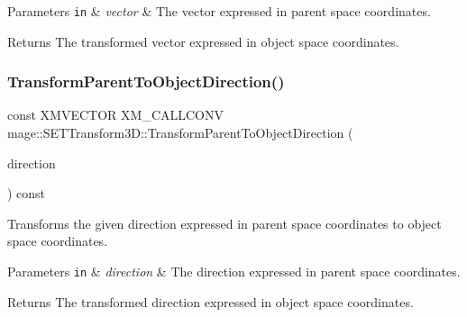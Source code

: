 \begin{DoxyParams}[1]{Parameters}
\mbox{\tt in}  & {\em vector} & The vector expressed in parent space coordinates. \\
\hline
\end{DoxyParams}
\begin{DoxyReturn}{Returns}
The transformed vector expressed in object space coordinates. 
\end{DoxyReturn}
\mbox{\label{classmage_1_1_s_e_t_transform3_d_a021c5832dd165db20d984c8e53315dc9}} 
\subsubsection{\texorpdfstring{Transform\+Parent\+To\+Object\+Direction()}{TransformParentToObjectDirection()}}
{\footnotesize\ttfamily const X\+M\+V\+E\+C\+T\+OR X\+M\+\_\+\+C\+A\+L\+L\+C\+O\+NV mage\+::\+S\+E\+T\+Transform3\+D\+::\+Transform\+Parent\+To\+Object\+Direction (\begin{DoxyParamCaption}\item[{F\+X\+M\+V\+E\+C\+T\+OR}]{direction }\end{DoxyParamCaption}) const\hspace{0.3cm}{\ttfamily [noexcept]}}

Transforms the given direction expressed in parent space coordinates to object space coordinates.


\begin{DoxyParams}[1]{Parameters}
\mbox{\tt in}  & {\em direction} & The direction expressed in parent space coordinates. \\
\hline
\end{DoxyParams}
\begin{DoxyReturn}{Returns}
The transformed direction expressed in object space coordinates. 
\end{DoxyReturn}
\mbox{\label{classmage_1_1_s_e_t_transform3_d_af933d681de001a8743490bdc4cc23345}} 
